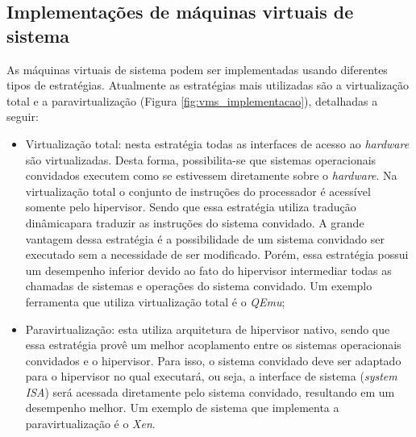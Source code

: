

\subsection{Implementações de máquinas virtuais de sistema}
\label{section:virtestrat}

As máquinas virtuais de sistema podem ser implementadas usando diferentes tipos de estratégias. Atualmente as estratégias mais utilizadas
são a virtualização total e a paravirtualização (Figura \ref{fig:vms_implementacao}), detalhadas a seguir:
\begin{itemize}
 \item Virtualização total: nesta estratégia todas as interfaces de acesso ao \textit{hardware} são virtualizadas. Desta forma, possibilita-se 
 que sistemas operacionais convidados executem como se estivessem diretamente sobre o \textit{hardware}. Na virtualização total o conjunto de 
 instruções do processador é acessível somente pelo hipervisor. Sendo que essa estratégia utiliza tradução dinâmica\footnotemark[1]
 para traduzir as instruções do sistema convidado. A grande vantagem dessa estratégia é a possibilidade de um sistema convidado ser executado 
 sem a necessidade de ser modificado. Porém, essa estratégia possui um desempenho inferior devido ao fato do hipervisor intermediar todas as 
 chamadas de sistemas e operações do sistema convidado. Um exemplo ferramenta que utiliza virtualização total é o \textit{QEmu};
 \item Paravirtualização: esta utiliza arquitetura de hipervisor nativo, sendo que essa estratégia provê um melhor acoplamento entre os 
 sistemas operacionais convidados e o hipervisor. Para isso, o sistema convidado deve ser adaptado para o hipervisor no qual executará, 
 ou seja, a interface de sistema (\textit{system ISA}) será acessada diretamente pelo sistema convidado, resultando em um desempenho melhor. 
 Um exemplo de sistema que implementa a paravirtualização é o \textit{Xen}.
\end{itemize}


